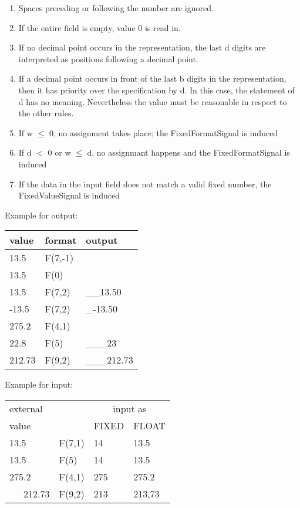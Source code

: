 \begin{accepted}
\begin{enumerate}
\begin{enumerate}
\item Spaces preceding or following the number are ignored.
\item If the entire field is empty, value 0 is read in.
\item If no decimal point occurs in the representation, the last d
digits are interpreted as positions following a decimal point.
\item If a decimal point occurs in front of the last b digits in the
representation, then it has priority over the specification by d. In
this case, the statement of d has no meaning. Nevertheless the value must
be reasonable in respect to the other rules. 
\item If w $\leq$ 0, no assignment takes place;
    the FixedFormatSignal is induced
\item If d $<$ 0 or w $\leq$ d, no assignmant happens and 
    the FixedFormatSignal is induced
\item If the data in the input field does not match a valid fixed 
   number, the FixedValueSignal is induced
\end{enumerate}
\end{enumerate}

Example for output:

\begin{tabular}{lll}
value  & format   & output \\ \hline
13.5   & F(7,-1)   &  \x \x {\em FixedFormatSignal!}  \\
13.5   & F(0)   &  \x \x {\em FixedFormatSignal!}  \\
13.5   & F(7,2)   & \_\_13.50  \\
-13.5   & F(7,2)   & \_-13.50  \\
275.2  & F(4,1)   &  \x \x {\em FixedValueSignal!} \\
22.8   & F(5)     & \_\_\_23 \\
212.73 & F(9,2)   & \_\_\_212.73 \\
\end{tabular}
\end{accepted}

\begin{accepted}
Example for input:

\begin{tabular}{llll}
external       &          & \multicolumn{2}{c}{input as}  \\ 
value       &          & FIXED & FLOAT  \\ \hline
13.5   & F(7,1)   &  14 & 13.5   \\
13.5   & F(5)     &  14 & 13.5   \\
275.2  & F(4,1)   & 275 & 275.2 \\
\ \ \ 212.73 &  F(9,2)&  213 & 213,73 \\
\end{tabular}

\end{accepted}

